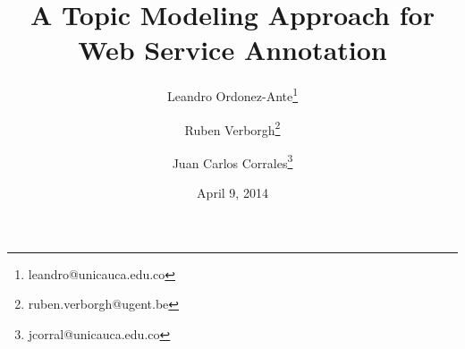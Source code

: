 \documentclass{article}%
\begin{document}
\title{A Topic Modeling Approach for Web Service Annotation}
\author[1]{Leandro Ordonez-Ante\thanks{leandro@unicauca.edu.co}}
\author[2]{Ruben Verborgh\thanks{ruben.verborgh@ugent.be}}
\author[1]{Juan Carlos Corrales\thanks{jcorral@unicauca.edu.co}}

\renewcommand\Authands{ and }
\date{April 9, 2014}
\maketitle











%
%
%
%
\end{document}
